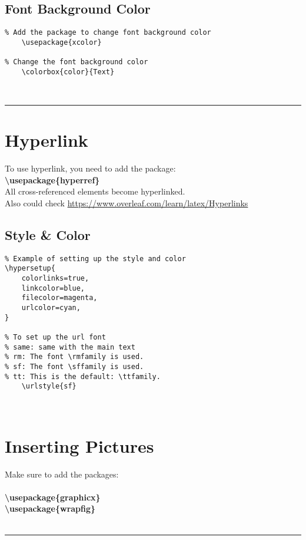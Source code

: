\documentclass[a4paper,12pt,titlepage]{article}
\begin{document}
\subsection{Font Background Color}
\begin{lstlisting}
% Add the package to change font background color
	\usepackage{xcolor}

% Change the font background color
	\colorbox{color}{Text}

\end{lstlisting}
~\\
\rule{\linewidth}{0.1mm}







\section{Hyperlink}
To use hyperlink, you need to add the package:
\\\colorbox{shade}{\textbf{\textbackslash usepackage\{hyperref\}}}
\\All cross-referenced elements become hyperlinked.
\\Also could check \url{https://www.overleaf.com/learn/latex/Hyperlinks}


\subsection{Style \& Color}
\begin{lstlisting}
% Example of setting up the style and color
\hypersetup{
    colorlinks=true,
    linkcolor=blue,
    filecolor=magenta,      
    urlcolor=cyan,
}

% To set up the url font
% same: same with the main text
% rm: The font \rmfamily is used.
% sf: The font \sffamily is used.
% tt: This is the default: \ttfamily.
	\urlstyle{sf}
\end{lstlisting}
~\\





\section{Inserting Pictures}
Make sure to add the packages:
\\
\\\colorbox{shade}{\textbf{\textbackslash usepackage\{graphicx\}}} 
\\\colorbox{shade}{\textbf{\textbackslash usepackage\{wrapfig\}}} 
\\
\\
\rule{\linewidth}{0.1mm}
\end{document}
